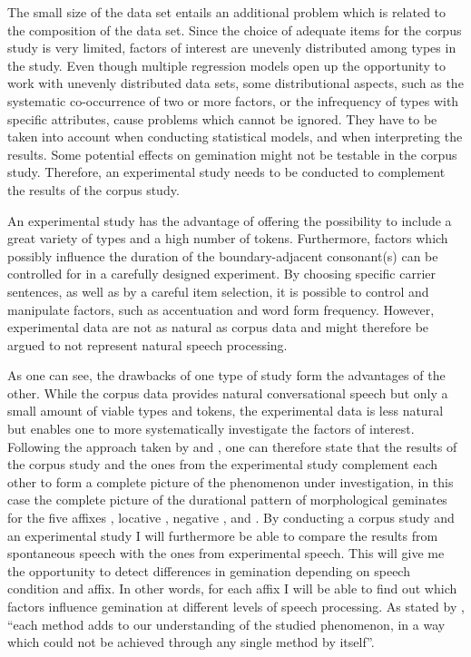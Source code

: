 The small size of the data set entails an additional problem which is related to the composition of the data set. Since the choice of adequate items for the  corpus study is very limited, factors of interest are unevenly distributed among types in the study. Even though multiple regression models open up the opportunity to work with unevenly distributed data sets, some distributional aspects, such as the systematic co-occurrence of two or more factors, or the infrequency of types with specific attributes, cause problems which cannot be ignored.  They have to be taken into account when conducting statistical models, and when interpreting the results. Some potential effects on gemination might not be testable in the corpus study. Therefore, an experimental study needs to be conducted to complement the results of the corpus study.




An experimental study has the advantage of offering the possibility to include a great variety of types and a high number of tokens. Furthermore, factors which possibly influence the duration of the boundary-adjacent consonant(s) can be controlled for in a carefully designed experiment. By choosing specific carrier sentences, as well as by a careful item selection, it is possible to control and manipulate factors, such as accentuation and word form frequency. 
However, experimental data are not as natural as corpus data and might therefore be argued to not represent natural speech processing. 

As one can see, the drawbacks of one type of study form the advantages of the other. While the corpus data provides natural conversational speech but only a small amount of viable types and tokens, the experimental data is less natural but enables one to more systematically investigate the factors of interest.
Following the approach taken by \cite{Arppe.2007} and \cite{Kunter.13.04.2017}, one can therefore state that the results of the corpus study and the ones from the experimental study complement each other to form a complete picture of the phenomenon under investigation, in this case the complete picture of the durational pattern of morphological geminates  for the five affixes , locative , negative ,  and .
By conducting a corpus study and an experimental study I will furthermore be able to compare the results from spontaneous speech with the ones from experimental speech. This will give me the opportunity to detect differences in gemination depending on speech condition and affix. In other words, for each affix I will be able to find out which factors influence gemination at different levels of speech processing. As stated by \citet[1]{Arppe.2007}, ``each method adds to our understanding of the studied phenomenon, in a way which could not be achieved through any single method by itself''.





